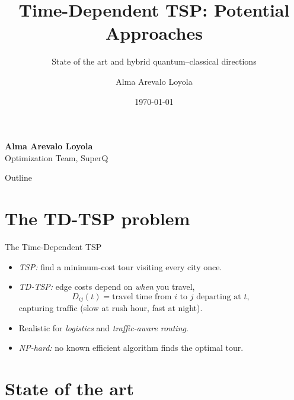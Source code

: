 \documentclass[
11pt,notheorems,hyperref={pdfauthor=Alma Arevalo Loyola}
]{beamer}
\title[TD-TSP: Potential Approaches]{Time-Dependent TSP: Potential Approaches}
\subtitle{State of the art and hybrid quantum--classical directions}
\author{Alma Arevalo Loyola}
\institute{Quantum Optimization Lab, SuperQ Quantum Computing Inc.}
\date{\today}
\renewcommand{\emphasize}[1]{\textcolor{emphasisblue}{\textit{#1}}}
\newcommand{\emphteal}[1]{\textcolor{emphasisteal}{\textit{#1}}}
\begin{document}
{
\begin{frame}
  \vspace*{-1.4cm}
  {\raggedleft{}\normalsize\insertdate\par}
  \vspace{1.6cm}
  {\inserttitle\par}
  \vspace{0.35cm}
  {\insertsubtitle\par}
  \vspace{0.9cm}
  {\footnotesize
    \textcolor{presenterhighlight}{\small\textbf{Alma Arevalo Loyola}}\\[0.3em]
    Optimization Team, SuperQ
  \par}
  \vfill
\end{frame}
}
\addtocounter{framenumber}{-1}

\begin{frame}{Outline}
  \tableofcontents
\end{frame}

\section{The TD-TSP problem}

\begin{frame}{The Time-Dependent TSP}
  \begin{itemize}
    \item \emphasize{TSP:} find a minimum-cost tour visiting every city once.
    \item \emphasize{TD-TSP:} edge costs depend on \emphteal{when} you travel,
    \[
      D_{ij}(t) = \text{travel time from } i \text{ to } j \text{ departing at } t,
    \]
    capturing traffic (slow at rush hour, fast at night).
    \item Realistic for \emphteal{logistics} and \emphteal{traffic-aware routing}.
    \item \emphasize{NP-hard:} no known efficient algorithm finds the optimal tour.
  \end{itemize}
\end{frame}

\section{State of the art}
\end{document}
